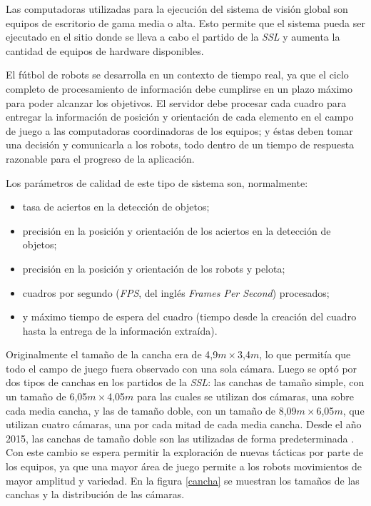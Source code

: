 Las computadoras utilizadas para la ejecución del sistema de visión global son
equipos de escritorio de gama media o alta. Esto permite que el sistema pueda
ser ejecutado en el sitio donde se lleva a cabo el partido de la \emph{SSL} y
aumenta la cantidad de equipos de hardware disponibles.

El fútbol de robots se desarrolla en un contexto de tiempo real, ya que el
ciclo completo de procesamiento de información debe cumplirse en un plazo
máximo para poder alcanzar los objetivos. El servidor debe procesar cada
cuadro para entregar la información de posición y orientación de cada elemento
en el campo de juego a las computadoras coordinadoras de los equipos; y éstas
deben tomar una decisión y comunicarla a los robots, todo dentro de un tiempo
de respuesta razonable para el progreso de la aplicación.

Los parámetros de calidad de este tipo de sistema son, normalmente:

\begin{itemize}

	\item 	tasa de aciertos en la detección de objetos;

	\item 	precisión en la posición y orientación de los aciertos en la
		detección de objetos;

	\item 	precisión en la posición y orientación de los robots y pelota;

	\item 	cuadros por segundo (\emph{FPS}, del inglés \emph{Frames Per
		Second}) procesados;

	\item 	y máximo tiempo de espera del cuadro (tiempo desde la creación
		del cuadro hasta la entrega de la información extraída).

\end{itemize}

Originalmente el tamaño de la cancha era de 4,9$m\times$3,4$m$, lo que
permitía que todo el campo de juego fuera observado con una sola cámara. Luego
se optó por dos tipos de canchas en los partidos de la \emph{SSL}: las canchas
de tamaño simple, con un tamaño de 6,05$m\times$4,05$m$ para las cuales se
utilizan dos cámaras, una sobre cada media cancha, y las de tamaño doble, con
un tamaño de 8,09$m\times$6,05$m$, que utilizan cuatro cámaras, una por cada
mitad de cada media cancha. Desde el año 2015, las canchas de tamaño doble son
las utilizadas de forma predeterminada \cite{sslrules2015}. Con este cambio se
espera permitir la exploración de nuevas tácticas por parte de los equipos, ya
que una mayor área de juego permite a los robots movimientos de mayor amplitud
y variedad. En la figura \ref{cancha} se muestran los tamaños de las canchas y
la distribución de las cámaras.

